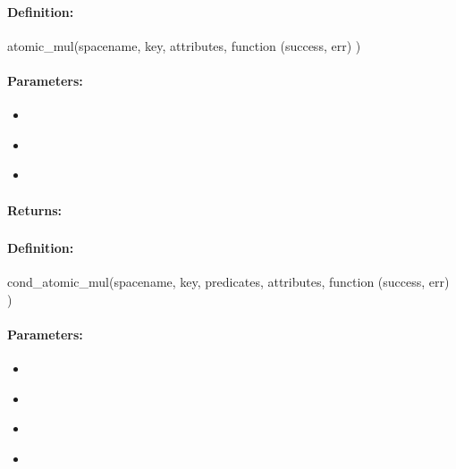 \paragraph{Definition:}
\begin{javascriptcode}
atomic_mul(spacename, key, attributes, function (success, err) {})
\end{javascriptcode}
\paragraph{Parameters:}
\begin{itemize}[noitemsep]
\item {}\\

\item {}\\

\item {}\\

\end{itemize}

\paragraph{Returns:}


\pagebreak
\subsubsection{}
\label{api:nodejs:cond_atomic_mul}


\paragraph{Definition:}
\begin{javascriptcode}
cond_atomic_mul(spacename, key, predicates, attributes, function (success, err) {})
\end{javascriptcode}
\paragraph{Parameters:}
\begin{itemize}[noitemsep]
\item {}\\

\item {}\\

\item {}\\

\item {}\\

\end{itemize}

